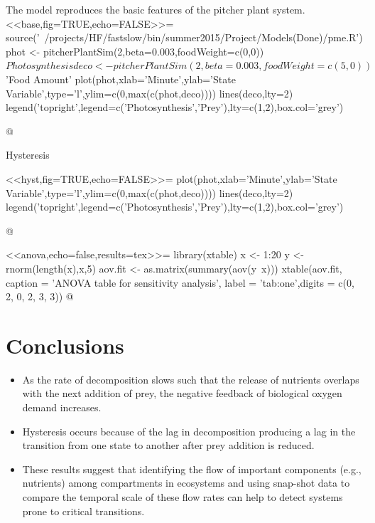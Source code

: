 \documentclass[a0,landscape]{a0poster}
\begin{document}
\begin{multicols}{4}
\begin{block}{The model reproduces the basic features of the pitcher plant system.}
<<base,fig=TRUE,echo=FALSE>>=
source('~/projects/HF/fastslow/bin/summer2015/Project/Models(Done)/pme.R')
phot <- pitcherPlantSim(2,beta=0.003,foodWeight=c(0,0))$Photosynthesis
deco <- pitcherPlantSim(2,beta=0.003,foodWeight=c(5,0))$'Food Amount'
plot(phot,xlab='Minute',ylab='State Variable',type='l',ylim=c(0,max(c(phot,deco))))
lines(deco,lty=2)
legend('topright',legend=c('Photosynthesis','Prey'),lty=c(1,2),box.col='grey')

@ 

\end{block}


\begin{block}{Hysteresis}

<<hyst,fig=TRUE,echo=FALSE>>=
plot(phot,xlab='Minute',ylab='State Variable',type='l',ylim=c(0,max(c(phot,deco))))
lines(deco,lty=2)
legend('topright',legend=c('Photosynthesis','Prey'),lty=c(1,2),box.col='grey')

@ 
  
\end{block}



<<anova,echo=false,results=tex>>=
library(xtable)
x <- 1:20
y <- rnorm(length(x),x,5)
aov.fit <- as.matrix(summary(aov(y~x)))
xtable(aov.fit, caption = 'ANOVA table for sensitivity analysis', 
label = 'tab:one',digits = c(0, 2, 0, 2, 3, 3))
@



\color{SaddleBrown} %

\section*{Conclusions}

\begin{itemize}
\item As the rate of decomposition slows such that the release of
  nutrients overlaps with the next addition of prey, the negative
  feedback of biological oxygen demand increases. 
\item Hysteresis occurs because of the lag in decomposition producing
  a lag in the transition from one state to another after prey
  addition is reduced.
\item These results suggest that identifying the flow of important
  components (e.g., nutrients) among compartments in ecosystems and
  using snap-shot data to compare the temporal scale of these flow
  rates can help to detect systems prone to critical transitions.
\end{itemize}


\end{multicols}
\end{document}
